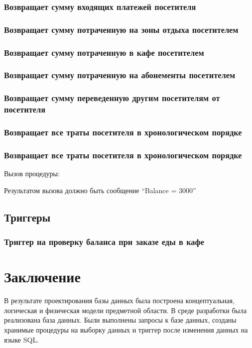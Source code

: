 \documentclass[a4paper]{article}
\begin{document}
\subsubsection{Возвращает сумму входящих платежей посетителя}


\subsubsection{Возвращает сумму потраченную на зоны отдыха посетителем}


\subsubsection{Возвращает сумму потраченную в кафе посетителем}


\subsubsection{Возвращает сумму потраченную на абонементы посетителем}


\subsubsection{Возвращает сумму переведенную другим посетителям от посетителя}


\subsubsection{Возвращает все траты посетителя в хронологическом порядке}


\subsubsection{Возвращает все траты посетителя в хронологическом порядке}

Вызов процедуры:

Результатом вызова должно быть сообщение ``Balance = 3000''

\subsection{Триггеры}
\subsubsection{Триггер на проверку баланса при заказе еды в кафе}


\section{Заключение}
	В результате проектирования базы данных была построена концептуальная,
логическая и физическая модели предметной области. В среде разработки была реализована
база данных. Были выполнены запросы к базе данных, созданы хранимые процедуры на
выборку данных и триггер после изменения данных на языке SQL.
\end{document}
